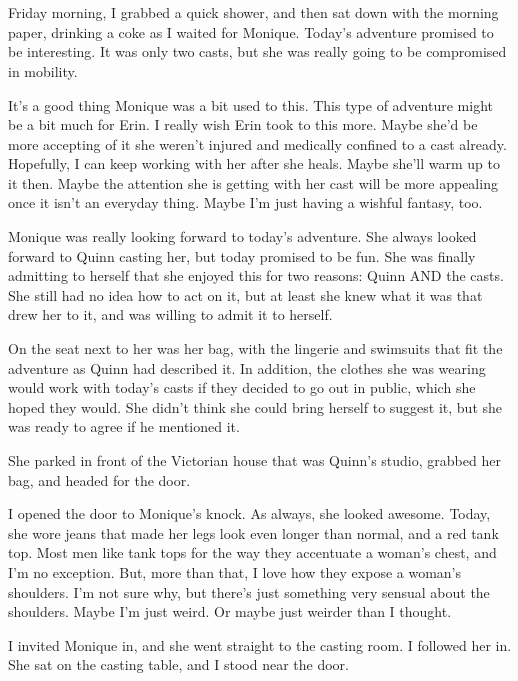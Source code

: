 \chapter{~}
Friday morning, I grabbed a quick shower, and then sat down with the morning paper,
drinking a coke as I waited for Monique. Today's adventure promised to be interesting. It was
only two casts, but she was really going to be compromised in mobility.

It's a good thing Monique was a bit used to this. This type of adventure might be a bit
much for Erin. I really wish Erin took to this more. Maybe she'd be more accepting of it she
weren't injured and medically confined to a cast already. Hopefully, I can keep working with her
after she heals. Maybe she'll warm up to it then. Maybe the attention she is getting with her
cast will be more appealing once it isn't an everyday thing. Maybe I'm just having a wishful
fantasy, too.

Monique was really looking forward to today's adventure. She always looked forward to
Quinn casting her, but today promised to be fun. She was finally admitting to herself that she
enjoyed this for two reasons: Quinn AND the casts. She still had no idea how to act on it, but
at least she knew what it was that drew her to it, and was willing to admit it to herself.

On the seat next to her was her bag, with the lingerie and swimsuits that fit the
adventure as Quinn had described it. In addition, the clothes she was wearing would work with
today's casts if they decided to go out in public, which she hoped they would. She didn't think
she could bring herself to suggest it, but she was ready to agree if he mentioned it.

She parked in front of the Victorian house that was Quinn's studio, grabbed her bag, and
headed for the door.

I opened the door to Monique's knock. As always, she looked awesome. Today, she wore jeans
that made her legs look even longer than normal, and a red tank top. Most men like tank tops for
the way they accentuate a woman's chest, and I'm no exception. But, more than that, I love how
they expose a woman's shoulders. I'm not sure why, but there's just something very sensual about
the shoulders. Maybe I'm just weird. Or maybe just weirder than I thought.

I invited Monique in, and she went straight to the casting room. I followed her in. She
sat on the casting table, and I stood near the door.

